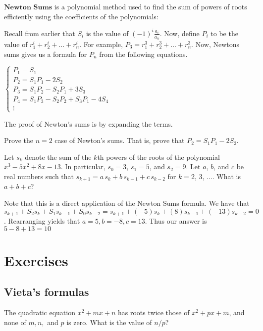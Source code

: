 \documentclass[sexy]{scrartcl}
\begin{document}
$\textbf{Newton Sums}$ is a polynomial method used to find the sum of powers of roots efficiently using the coefficients of the polynomials:

\begin{theorem}
Recall from earlier that $S_i$ is the value of $(-1)^{i}\frac{a_i}{a_n}$. Now, define $P_i$ to be the value of $r_1^i+r_2^i+ \dots + r_n^i$. For example, $P_3 = r_1^3+r_2^3+ \dots + r_n^3$. Now, Newtons sums gives us a formula for $P_n$ from the following equations.

\noindent
$\begin{cases}
P_1 = S_1 \\
P_2 = S_1P_1 - 2S_2 \\
P_3 = S_1P_2 - S_2P_1 + 3S_3 \\
P_4 = S_1P_3 - S_2P_2 + S_3P_1 - 4S_4 \\
\vdots
\end{cases}$
\end{theorem}
The proof of Newton's sums is by expanding the terms. 

\begin{exercise}
Prove the $n=2$ case of Newton's sums. That is, prove that $P_2 = S_1P_1 - 2S_2$. 
\end{exercise}

\begin{example}[2019 AMC 12A]
Let $s_k$ denote the sum of the $\textit{k}$th powers of the roots of the polynomial $x^3-5x^2+8x-13$. In particular, $s_0=3$, $s_1=5$, and $s_2=9$. Let $a$, $b$, and $c$ be real numbers such that $s_{k+1} = a \, s_k + b \, s_{k-1} + c \, s_{k-2}$ for $k = 2$, $3$, $....$ What is $a+b+c$?
\end{example}
\begin{soln}
Note that this is a direct application of the Newton Sums formula. We have that $s_{k+1}+S_{2}s_k+S_{1}s_{k-1}+S_0s_{k-2} = s_{k+1}+(-5)s_k+(8)s_{k-1}+(-13)s_{k-2}=0$. Rearranging yields that $a=5, b=-8, c=13$. Thus our answer is $5-8+13=\boxed{10}$
\end{soln}

\section{Exercises}
\subsection{Vieta's formulas}
\begin{exercise}[AMC 12B 2005/12]
The quadratic equation $x^2+mx+n$ has roots twice those of $x^2+px+m$, and none of $m,n,$ and $p$ is zero. What is the value of $n/p$?
\end{exercise} %
\end{document}
